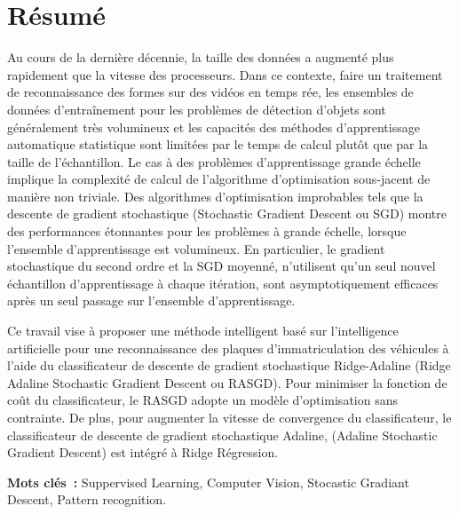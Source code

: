 \chapter*{Résumé} 
	Au cours de la dernière décennie, la taille des données a augmenté plus rapidement que la vitesse des processeurs. 
	Dans ce contexte, faire un traitement de reconnaissance des formes sur des vidéos en temps rée, les ensembles de données d'entraînement pour les problèmes de détection d'objets sont généralement très volumineux et les capacités des méthodes d'apprentissage automatique statistique sont limitées par le temps de calcul plutôt que par la taille de l'échantillon. 
	Le cas à des problèmes d'apprentissage grande échelle implique la complexité de calcul de l'algorithme d'optimisation sous-jacent de manière non triviale. Des algorithmes d'optimisation improbables tels que la descente de gradient stochastique (Stochastic Gradient Descent ou SGD) montre des performances étonnantes pour les problèmes à grande échelle, lorsque l'ensemble d'apprentissage est volumineux. 
	En particulier, le gradient stochastique du second ordre et la SGD moyenné, n'utilisent qu'un seul nouvel échantillon d'apprentissage à chaque itération, sont asymptotiquement efficaces après un seul passage sur l'ensemble d'apprentissage.
	
	Ce travail vise à proposer une méthode  intelligent basé sur l'intelligence artificielle pour une reconnaissance des plaques d’immatriculation des véhicules à l'aide du classificateur de descente de gradient stochastique Ridge-Adaline (Ridge Adaline Stochastic Gradient Descent ou RASGD).
	Pour minimiser la fonction de coût du classificateur, le RASGD adopte un modèle d'optimisation sans contrainte. De plus, pour augmenter la vitesse de convergence du classificateur, le classificateur de descente de gradient stochastique Adaline, (Adaline Stochastic Gradient Descent) est intégré à Ridge Régression.

	\begin{singlespace}
		\textbf{Mots clés~:} Suppervised Learning, Computer Vision, Stocastic Gradiant Descent, Pattern recognition. 
	\end{singlespace}